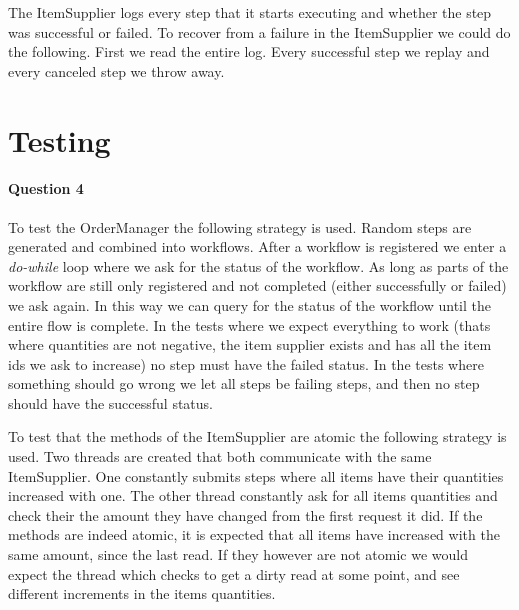 \documentclass[a4paper, 11pt]{article}
\begin{document}

The ItemSupplier logs every step that it starts executing and whether the step was successful or failed. To recover from a failure in the ItemSupplier we could do the following. First we read the entire log. Every successful step we replay and every canceled step we throw away.


\section{Testing} %
\label{sec:testing}

\paragraph{Question 4} %
\label{par:question_4}

To test the OrderManager the following strategy is used. Random steps are generated and combined into workflows. After a workflow is registered we enter a \textit{do-while} loop where we ask for the status of the workflow. As long as parts of the workflow are still only registered and not completed (either successfully or failed) we ask again. In this way we can query for the status of the workflow until the entire flow is complete. In the tests where we expect everything to work (thats where quantities are not negative, the item supplier exists and has all the item ids we ask to increase) no step must have the failed status. In the tests where something should go wrong we let all steps be failing steps, and then no step should have the successful status.

To test that the methods of the ItemSupplier are atomic the following strategy is used. Two threads are created that both communicate with the same ItemSupplier. One constantly submits steps where all items have their quantities increased with one. The other thread constantly ask for all items quantities and check their the amount they have changed from the first request it did. If the methods are indeed atomic, it is expected that all items have increased with the same amount, since the last read. If they however are not atomic we would expect the thread which checks to get a dirty read at some point, and see different increments in the items quantities.
\end{document}
